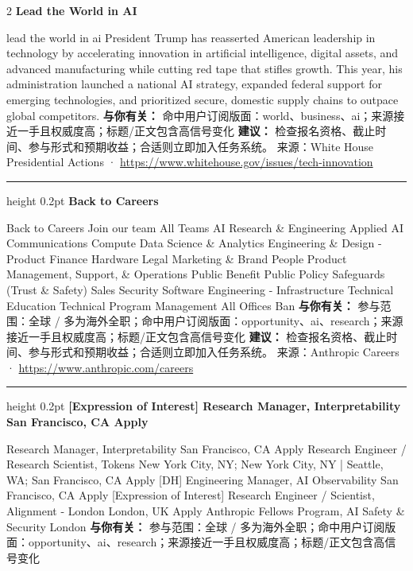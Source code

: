 \documentclass[10.5pt]{ctexart}
\begin{document}
\begin{multicols}{2}
{\large\bfseries Lead the World in AI}\par
lead the world in ai President Trump has reasserted American leadership in technology by accelerating innovation in artificial intelligence, digital assets, and advanced manufacturing while cutting red tape that stifles growth. This year, his administration launched a national AI strategy, expanded federal support for emerging technologies, and prioritized secure, domestic supply chains to outpace global competitors.
\textbf{与你有关：} 命中用户订阅版面：world、business、ai；来源接近一手且权威度高；标题/正文包含高信号变化
\textbf{建议：} 检查报名资格、截止时间、参与形式和预期收益；合适则立即加入任务系统。
{\footnotesize\color{ormuted} 来源：White House Presidential Actions · \url{https://www.whitehouse.gov/issues/tech-innovation}}
\vspace{2mm}
\hrule height 0.2pt
\vspace{2mm}
{\large\bfseries Back to Careers}\par
Back to Careers Join our team All Teams AI Research \& Engineering Applied AI Communications Compute Data Science \& Analytics Engineering \& Design - Product Finance Hardware Legal Marketing \& Brand People Product Management, Support, \& Operations Public Benefit Public Policy Safeguards (Trust \& Safety) Sales Security Software Engineering - Infrastructure Technical Education Technical Program Management All Offices Ban
\textbf{与你有关：} 参与范围：全球 / 多为海外全职；命中用户订阅版面：opportunity、ai、research；来源接近一手且权威度高；标题/正文包含高信号变化
\textbf{建议：} 检查报名资格、截止时间、参与形式和预期收益；合适则立即加入任务系统。
{\footnotesize\color{ormuted} 来源：Anthropic Careers · \url{https://www.anthropic.com/careers}}
\vspace{2mm}
\hrule height 0.2pt
\vspace{2mm}
{\large\bfseries [Expression of Interest] Research Manager, Interpretability San Francisco, CA Apply}\par
[Expression of Interest] Research Manager, Interpretability San Francisco, CA Apply Research Engineer / Research Scientist, Tokens New York City, NY; New York City, NY | Seattle, WA; San Francisco, CA Apply [DH] Engineering Manager, AI Observability San Francisco, CA Apply [Expression of Interest] Research Engineer / Scientist, Alignment - London London, UK Apply Anthropic Fellows Program, AI Safety \& Security London
\textbf{与你有关：} 参与范围：全球 / 多为海外全职；命中用户订阅版面：opportunity、ai、research；来源接近一手且权威度高；标题/正文包含高信号变化

\end{multicols}
\end{document}
